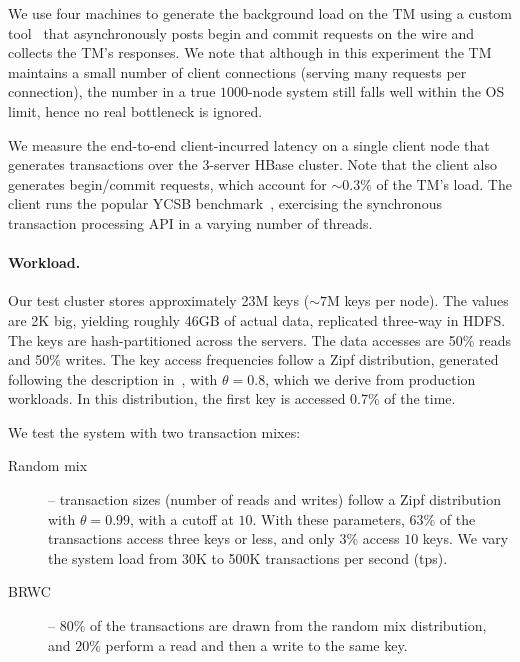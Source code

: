 We use four machines to generate the background load on the TM using a custom tool~\cite{Omid2017} 
that asynchronously posts begin and commit requests on the wire and collects the TM's responses. 
We note that although in this experiment the TM maintains a small number of client connections (serving many requests per connection), 
the number in a true $1000$-node system still falls well within the OS limit, hence no real bottleneck is ignored. 

We measure the end-to-end client-incurred latency on a single client node that generates transactions over the $3$-server HBase cluster. 
Note that the client also generates begin/commit requests, which account for \mbox{$\sim0.3\%$} of the TM's load.
The client runs the popular YCSB benchmark~\cite{Cooper:2010:BCS:1807128.1807152}, 
exercising the synchronous transaction processing API in a varying number of threads. 

\paragraph{Workload.}

Our test cluster stores approximately 23M keys ($\sim\!\!7$M keys per node). 
The values are 2K big, yielding roughly 46GB of actual data, replicated three-way in HDFS. The keys are hash-partitioned
across the servers. The data accesses are 50\% reads and 
50\% writes. The key access frequencies follow a Zipf distribution, generated following 
the description in~\cite{Gray:1994:QGB:191839.191886}, with $\theta=0.8$, which we derive from production 
workloads. In this distribution, the first key is accessed 0.7\% of the  time.

\noindent
We test the system with two transaction mixes:
\begin{description}
\item[Random mix] -- 
transaction sizes (number of reads and writes) follow a Zipf distribution with $\theta=0.99$, with a cutoff at $10$. 
With these parameters, $63\%$ of the transactions access three keys or less, and only $3\%$ access $10$ keys. 
We vary the system load from 30K to 500K transactions per second (tps). 
\item[BRWC] -- $80\%$ of the transactions are drawn from the random mix distribution, and $20\%$ perform a read
and then a write to the same key. 
\end{description}

